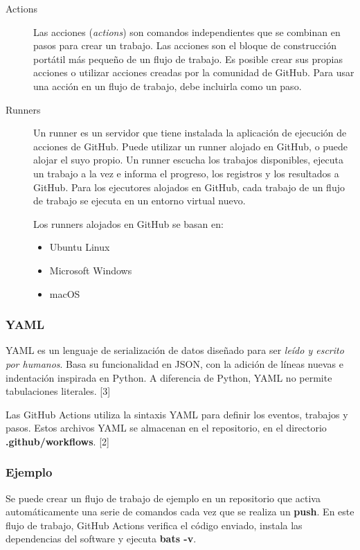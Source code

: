\documentclass[twoside,twocolumn]{article}
\begin{document}
\begin{description}
    \item[Actions]
    Las acciones (\textit{actions}) son comandos independientes que se combinan en pasos para crear un trabajo. Las acciones son el bloque de construcción portátil más pequeño de un flujo de trabajo. Es posible crear sus propias acciones o utilizar acciones creadas por la comunidad de GitHub. Para usar una acción en un flujo de trabajo, debe incluirla como un paso.

    \item[Runners]
    Un runner es un servidor que tiene instalada la aplicación de ejecución de acciones de GitHub. Puede utilizar un runner alojado en GitHub, o puede alojar el suyo propio. Un runner escucha los trabajos disponibles, ejecuta un trabajo a la vez e informa el progreso, los registros y los resultados a GitHub. Para los ejecutores alojados en GitHub, cada trabajo de un flujo de trabajo se ejecuta en un entorno virtual nuevo.

    Los runners alojados en GitHub se basan en:

    \begin{itemize}
        \item Ubuntu Linux
        \item Microsoft Windows
        \item macOS
    \end{itemize}


\end{description}

\subsubsection{YAML}

YAML es un lenguaje de serialización de datos diseñado para ser \textit{leído y escrito por humanos}. Basa su funcionalidad en JSON, con la adición de líneas nuevas e indentación inspirada en Python. A diferencia de Python, YAML no permite tabulaciones literales. [3]

Las GitHub Actions utiliza la sintaxis YAML para definir los eventos, trabajos y pasos. Estos archivos YAML se almacenan en el repositorio, en el directorio \textbf{.github/workflows}. [2]

\subsubsection{Ejemplo}



Se puede crear un flujo de trabajo de ejemplo en un repositorio que activa automáticamente una serie de comandos cada vez que se realiza un \textbf{push}. En este flujo de trabajo, GitHub Actions verifica el código enviado, instala las dependencias del software y ejecuta \textbf{bats -v}.
\end{document}
